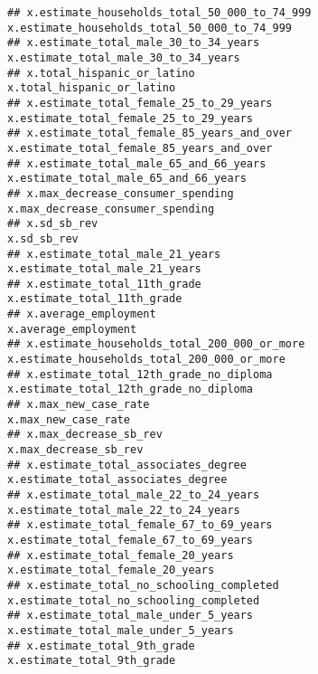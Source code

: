 \documentclass[
]{article}
\begin{document}
\begin{verbatim}
## x.estimate_households_total_50_000_to_74_999                               x.estimate_households_total_50_000_to_74_999
## x.estimate_total_male_30_to_34_years                                               x.estimate_total_male_30_to_34_years
## x.total_hispanic_or_latino                                                                   x.total_hispanic_or_latino
## x.estimate_total_female_25_to_29_years                                           x.estimate_total_female_25_to_29_years
## x.estimate_total_female_85_years_and_over                                     x.estimate_total_female_85_years_and_over
## x.estimate_total_male_65_and_66_years                                             x.estimate_total_male_65_and_66_years
## x.max_decrease_consumer_spending                                                       x.max_decrease_consumer_spending
## x.sd_sb_rev                                                                                                 x.sd_sb_rev
## x.estimate_total_male_21_years                                                           x.estimate_total_male_21_years
## x.estimate_total_11th_grade                                                                 x.estimate_total_11th_grade
## x.average_employment                                                                               x.average_employment
## x.estimate_households_total_200_000_or_more                                 x.estimate_households_total_200_000_or_more
## x.estimate_total_12th_grade_no_diploma                                           x.estimate_total_12th_grade_no_diploma
## x.max_new_case_rate                                                                                 x.max_new_case_rate
## x.max_decrease_sb_rev                                                                             x.max_decrease_sb_rev
## x.estimate_total_associates_degree                                                   x.estimate_total_associates_degree
## x.estimate_total_male_22_to_24_years                                               x.estimate_total_male_22_to_24_years
## x.estimate_total_female_67_to_69_years                                           x.estimate_total_female_67_to_69_years
## x.estimate_total_female_20_years                                                       x.estimate_total_female_20_years
## x.estimate_total_no_schooling_completed                                         x.estimate_total_no_schooling_completed
## x.estimate_total_male_under_5_years                                                 x.estimate_total_male_under_5_years
## x.estimate_total_9th_grade                                                                   x.estimate_total_9th_grade

\end{verbatim}
\end{document}
